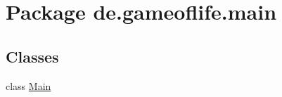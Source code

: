 \hypertarget{namespacede_1_1gameoflife_1_1main}{\section{Package de.\-gameoflife.\-main}
\label{namespacede_1_1gameoflife_1_1main}
}
\subsection*{Classes}
\begin{DoxyCompactItemize}
\item 
class \hyperlink{classde_1_1gameoflife_1_1main_1_1Main}{Main}
\end{DoxyCompactItemize}
